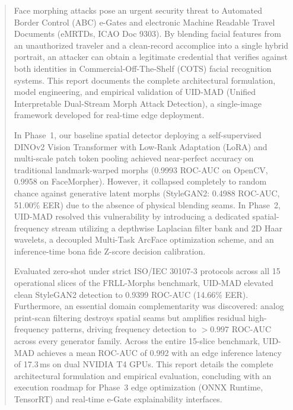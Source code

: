 \documentclass[11pt,a4paper]{article}
\begin{document}
\begin{abstract}
\noindent Face morphing attacks pose an urgent security threat to Automated Border Control (ABC) e-Gates and electronic Machine Readable Travel Documents (eMRTDs, ICAO Doc 9303). By blending facial features from an unauthorized traveler and a clean-record accomplice into a single hybrid portrait, an attacker can obtain a legitimate credential that verifies against both identities in Commercial-Off-The-Shelf (COTS) facial recognition systems. This report documents the complete architectural formulation, model engineering, and empirical validation of UID-MAD (Unified Interpretable Dual-Stream Morph Attack Detection), a single-image framework developed for real-time edge deployment. 

In Phase~1, our baseline spatial detector deploying a self-supervised DINOv2 Vision Transformer with Low-Rank Adaptation (LoRA) and multi-scale patch token pooling achieved near-perfect accuracy on traditional landmark-warped morphs (0.9993 ROC-AUC on OpenCV, 0.9958 on FaceMorpher). However, it collapsed completely to random chance against generative latent morphs (StyleGAN2: 0.4988 ROC-AUC, 51.00\% EER) due to the absence of physical blending seams. In Phase~2, UID-MAD resolved this vulnerability by introducing a dedicated spatial-frequency stream utilizing a depthwise Laplacian filter bank and 2D Haar wavelets, a decoupled Multi-Task ArcFace optimization scheme, and an inference-time bona fide Z-score decision calibration. 

Evaluated zero-shot under strict ISO/IEC 30107-3 protocols across all 15 operational slices of the FRLL-Morphs benchmark, UID-MAD elevated clean StyleGAN2 detection to 0.9399 ROC-AUC (14.66\% EER). Furthermore, an essential domain complementarity was discovered: analog print-scan filtering destroys spatial seams but amplifies residual high-frequency patterns, driving frequency detection to $>0.997$ ROC-AUC across every generator family. Across the entire 15-slice benchmark, UID-MAD achieves a mean ROC-AUC of 0.992 with an edge inference latency of 17.3\,ms on dual NVIDIA T4 GPUs. This report details the complete architectural formulation and empirical evaluation, concluding with an execution roadmap for Phase~3 edge optimization (ONNX Runtime, TensorRT) and real-time e-Gate explainability interfaces.
\end{abstract}
\end{document}

